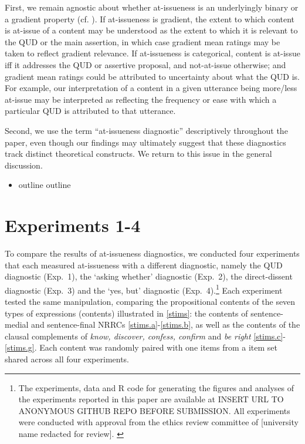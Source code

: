 \documentclass[times,linguex,xcolor]{glossa}
\begin{document}
  First, we remain agnostic about whether at-issueness is an underlyingly binary or a gradient property (cf. \citealt{tonhauser_how_2018,barnes_information_2023}). If at-issueness is gradient, the extent to which content is at-issue of a content may be understood as the extent to which it is relevant to the QUD or the main assertion, in which case gradient mean ratings may be taken to reflect gradient relevance. If at-issueness is categorical, content is at-issue iff it addresses the QUD or assertive proposal, and not-at-issue otherwise; and gradient mean ratings could be attributed to uncertainty about what the QUD is. For example, our interpretation of a content in a given utterance being more/less at-issue may be interpreted as reflecting the frequency or ease with which a particular QUD is attributed to that utterance.

  Second, we use the term “at-issueness diagnostic” descriptively throughout the paper, even though our findings may ultimately suggest that these diagnostics track distinct theoretical constructs. We return to this issue in the general discussion.

  \begin{itemize}
    \item outline outline
  \end{itemize}



\section{Experiments 1-4 \label{sec:2_experiments}}

    To compare the results of at-issueness diagnostics, we conducted four experiments that each measured at-issueness with a different diagnostic, namely the QUD diagnostic (Exp.~1), the `asking whether' diagnostic (Exp.~2), the direct-dissent diagnostic (Exp.~3) and the `yes, but' diagnostic (Exp.~4).\footnote{The experiments, data and R code for generating the figures and analyses of the experiments reported in this paper are available at INSERT URL TO ANONYMOUS GITHUB REPO BEFORE SUBMISSION. All experiments were conducted with approval from the ethics review committee of [university name redacted for review]. \label{f:github}}
    Each experiment tested the same manipulation, comparing the propositional contents of the seven types of expressions (contents) illustrated in \ref{stims}: the contents of sentence-medial and sentence-final NRRCs \ref{stims.a}-\ref{stims.b}, as well as the contents of the clausal complements of \emph{know, discover, confess, confirm} and \emph{be right} \ref{stims.c}-\ref{stims.g}. Each content was randomly paired with one items from a item set shared across all four experiments.
\end{document}
